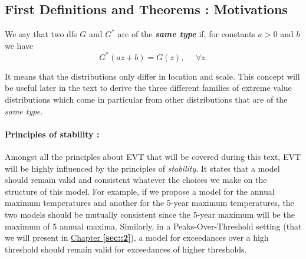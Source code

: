 

\subsection*{First Definitions and Theorems : Motivations}
\theoremstyle{definition}
\begin{definition}\label{similardf} We say that two dfs $G$ and $G^*$ are of the \emph{\textbf{same type}} if, for constants $a>0$ and $b$ we have
	\begin{equation}\label{simm}
	G^*(az+b)=G(z), \ \ \ \ \ \ \forall z.
	\end{equation}
\end{definition}
It means that the distributions only differ in location and scale. 
This concept will be useful later in the text to derive the three different families of extreme value distributions which come in particular from other distributions that are of the \emph{same type}.


\paragraph*{Principles of stability :}
Amongst all the principles about EVT that will be covered during this text, EVT will be highly influenced by the principles of \emph{stability}. It states that a model should remain valid and consistent whatever the choices we make on the structure of this model.
For example, if we propose a model for the annual maximum temperatures and another for the 5-year maximum temperatures, the two models should be mutually consistent since the 5-year maximum will be the maximum of 5 annual maxima. Similarly, in a Peaks-Over-Threshold setting (that we will present in \hyperref[sec::2]{Chapter \textbf{\ref{sec::2}}}), a model for exceedances over a high threshold should remain valid for exceedances of higher thresholds. 




